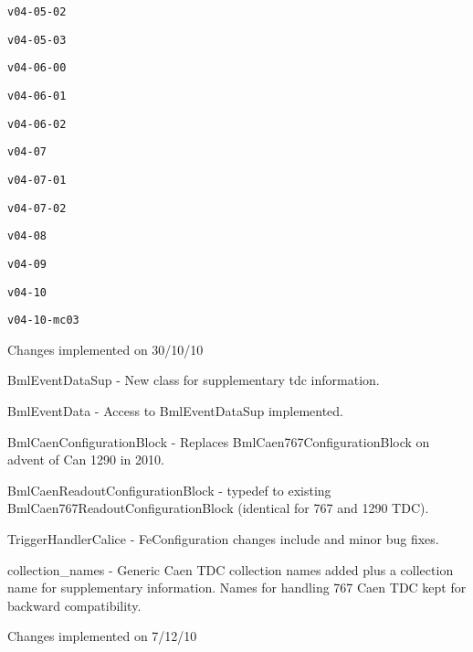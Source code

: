  {\tt v04-\/05-\/02} \par
 {\tt v04-\/05-\/03} \par
 {\tt v04-\/06-\/00} \par
 {\tt v04-\/06-\/01} \par
 {\tt v04-\/06-\/02} \par
 {\tt v04-\/07} \par
 {\tt v04-\/07-\/01} \par
 {\tt v04-\/07-\/02} \par
 {\tt v04-\/08} \par
 {\tt v04-\/09} \par
 {\tt v04-\/10} \par
 {\tt v04-\/10-\/mc03} \par
  Changes implemented on 30/10/10  \par

\begin{DoxyItemize}
\item Bml\-Event\-Data\-Sup -\/ New class for supplementary tdc information. \par

\item Bml\-Event\-Data -\/ Access to Bml\-Event\-Data\-Sup implemented. \par

\item Bml\-Caen\-Configuration\-Block -\/ Replaces Bml\-Caen767\-Configuration\-Block on advent of Can 1290 in 2010. \par

\item Bml\-Caen\-Readout\-Configuration\-Block -\/ typedef to existing Bml\-Caen767\-Readout\-Configuration\-Block (identical for 767 and 1290 T\-D\-C). \par

\item Trigger\-Handler\-Calice -\/ Fe\-Configuration changes include and minor bug fixes. \par

\item collection\-\_\-names -\/ Generic Caen T\-D\-C collection names added plus a collection name for supplementary information. Names for handling 767 Caen T\-D\-C kept for backward compatibility.\par

\end{DoxyItemize}

Changes implemented on 7/12/10  \par

